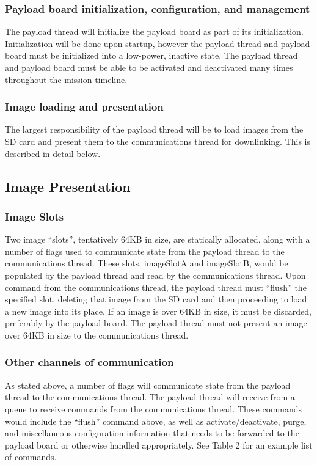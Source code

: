 \documentclass{article}
\begin{document}
\subsubsection{Payload board initialization, configuration, and management}
The payload thread will initialize the payload board as part of its initialization.
Initialization will be done upon startup, however the payload thread and payload
board must be initialized into a low-power, inactive state. The payload thread
and payload board must be able to be activated and deactivated many times
throughout the mission timeline.

\subsubsection{Image loading and presentation}
The largest responsibility of the payload thread will be to load images from 
the SD card and present them to the communications thread for downlinking. This
is described in detail below.

\subsection{Image Presentation}
\subsubsection{Image Slots}
Two image ``slots'', tentatively 64KB in size, are statically allocated,
along with a number of flags  used to communicate state from the payload thread
to the communications thread. These slots, imageSlotA and imageSlotB, would be
populated by the payload thread and read by the communications thread. Upon
command from the communications thread, the payload thread must ``flush'' the
specified slot, deleting that image from the SD card and then proceeding to
load a new image into its place. If an image is over 64KB in size, it must be
discarded, preferably by the payload board. The payload thread must not present
an image over 64KB in size to the communications thread.

\subsubsection{Other channels of communication}
As stated above, a number of flags will communicate state from the payload
thread to the communications thread. The payload thread will receive from a 
queue to receive commands from the communications thread. These commands would
include the ``flush'' command above, as well as activate/deactivate, purge, and
miscellaneous configuration information that needs to be forwarded 
to the payload
board or otherwise handled appropriately. See Table 2 for an example list of
commands.
\end{document}
